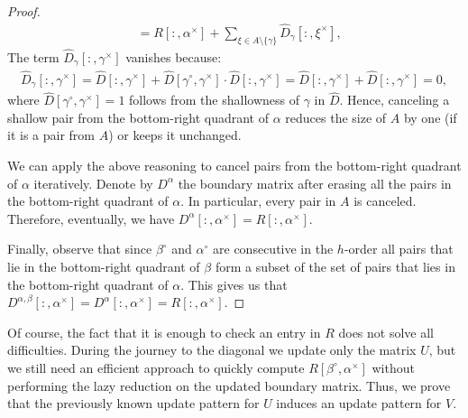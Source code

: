 \documentclass[a4paper,12pt, USenglish,cleveref,autoref,thm-restate]{article}
\newcommand{\mf}{h}
\newcommand{\mU}{U}
\newcommand{\mR}{R}
\newcommand{\mV}{V}
\newcommand{\mD}{D}
\newcommand{\bth}[1]{#1^\circ}
\newcommand{\dth}[1]{#1^{\!\times}}
\newcommand{\bds}{\alpha}
\newcommand{\bdt}{\beta}
\newcommand{\bda}{\xi}
\newcommand{\bdb}{\gamma}
\begin{document}
\begin{appendices}
\begin{proof}
\begin{align*}
        &= \mR[:,\dth\bds] +\sum\limits_{\bda \in A\setminus\{\bdb\}} \hat{\mD}_{\bdb}[:,\dth\bda],
\end{align*}
The term $\hat{\mD}_{\bdb}[:,\dth\bdb]$ vanishes because:
\begin{align*}
    \hat{\mD}_{\bdb}[:,\dth\bdb] = \hat{\mD}[:,\dth\bdb] + \hat{\mD}[\bth\bdb,\dth\bdb] \cdot \hat{\mD}[:,\dth\bdb] = \hat{\mD}[:,\dth\bdb] + \hat{\mD}[:,\dth\bdb] = 0,
\end{align*}
where  $\hat{\mD}[\bth\bdb,\dth\bdb]  = 1$ follows from the shallowness of $\bdb$ in $\hat{\mD}$.
Hence, canceling a shallow pair from the bottom-right quadrant of $\bds$ reduces the size of $A$ by one (if it is a pair from $A$) or keeps it unchanged. 

\noindent We can apply the above reasoning to cancel pairs from the bottom-right quadrant of $\bds$ iteratively.
Denote by $\mD^{\bds}$ the boundary matrix after erasing all the pairs in the bottom-right quadrant of $\bds$. 
In particular, every pair in $A$ is canceled. 
Therefore, eventually, we have $\mD^{\bds}[:,\dth\bds] = \mR[:,\dth\bds]$.



\noindent Finally, observe that since $\bth\bdt$ and $\bth\alpha$ are consecutive in the $\mf$-order all pairs that lie in the bottom-right quadrant of $\bdt$ form a subset of the set of pairs that lies in the bottom-right quadrant of $\bds$. 
This gives us that $\mD^{\bds,\bdt}[:,\dth\bds] = \mD^{\bds}[:,\dth\bds] = \mR[:,\dth\bds].$





\end{proof}

\noindent Of course, the fact that it is enough to check an entry in \(\mR\) does not solve all difficulties.
During the journey to the diagonal we update only the matrix \(\mU\), 
    but we still need an efficient approach to quickly compute \(\mR[\bth\bdt,\dth\bds]\) without performing the lazy reduction on the updated boundary matrix.
Thus, we prove that the previously known update pattern for \(\mU\) induces an update pattern for \(\mV\).


\end{appendices}
\end{document}
